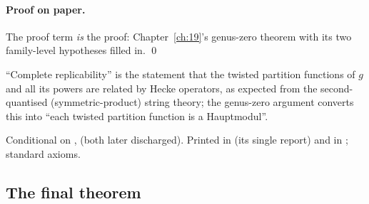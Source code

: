 \paragraph{Proof on paper.}  The proof term \emph{is} the proof: Chapter~\ref{ch:19}'s genus-zero theorem with its two
family-level hypotheses filled in. \qed
\begin{physics}
``Complete replicability'' is the statement that the twisted partition functions of $g$ and all its powers are related by
Hecke operators, as expected from the second-quantised (symmetric-product) string theory; the genus-zero argument
converts this into ``each twisted partition function is a Hauptmodul''.
\end{physics}
\begin{status}
Conditional on ,  (both later discharged).  Printed in
 (its single report) and in
; standard axioms.
\end{status}

\subsection{The final theorem}

